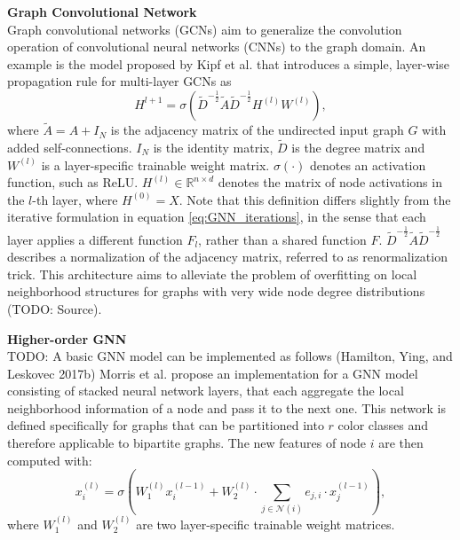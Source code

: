 \textbf{Graph Convolutional Network} \\
Graph convolutional networks (GCNs) aim to generalize the convolution operation of convolutional neural networks (CNNs) to the graph domain. An example is the model proposed by Kipf et al. \cite{kipf2016semi} that introduces a simple, layer-wise propagation rule for multi-layer GCNs as
\begin{equation}
    H^{l+1} = \sigma(\tilde{D}^{-\frac{1}{2}}\tilde{A}\tilde{D}^{-\frac{1}{2}}H^{(l)}W^{(l)}),
\end{equation}
where $\tilde{A} = A + I_N$ is the adjacency matrix of the undirected input graph $G$ with added self-connections. $I_N$ is the identity matrix, $\tilde{D}$ is the degree matrix and $W^{(l)}$ is a layer-specific trainable weight matrix. $\sigma(\cdot)$ denotes an activation function, such as ReLU. $H^{(l)} \in \mathbb{R}^{n\times d}$ denotes the matrix of node activations in the $l$-th layer, where $H^{(0)} = X$. Note that this definition differs slightly from the iterative formulation in equation \ref{eq:GNN_iterations}, in the sense that each layer applies a different function $F_l$, rather than a shared function $F$. $\tilde{D}^{-\frac{1}{2}}\tilde{A}\tilde{D}^{-\frac{1}{2}}$ describes a normalization of the adjacency matrix, referred to as renormalization trick. This architecture aims to alleviate the problem of overfitting on local neighborhood structures for graphs with very wide node degree distributions (TODO: Source).


\textbf{Higher-order GNN} \\
TODO: A basic GNN model can be implemented as follows (Hamilton, Ying, and Leskovec 2017b)
Morris et al. \cite{morris2019weisfeiler} propose an implementation for a GNN model consisting of stacked neural network layers, that each aggregate the local neighborhood information of a node and pass it to the next one. This network is defined specifically for graphs that can be partitioned into $r$ color classes and therefore applicable to bipartite graphs. The new features of node $i$ are then computed with:
\begin{equation}
    \label{eq:higher-order-gnn}
    x_i^{(l)} = \sigma(W_1^{(l)}x_i^{(l-1)}+W_2^{(l)}\cdot\sum_{j\in\mathcal{N}(i)}e_{j,i}\cdot x_j^{(l-1)}),
\end{equation}
where $W_1^{(l)}$ and $W_2^{(l)}$ are two layer-specific trainable weight matrices.

